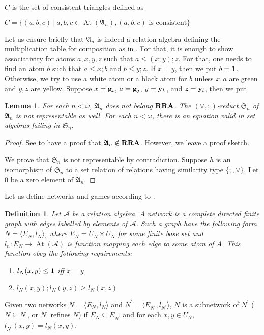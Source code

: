 \documentclass[a4paper]{article}
\theoremstyle{defin}
\newtheorem{defin}{Definition}
\theoremstyle{theorem}
\theoremstyle{prop}
\theoremstyle{lemma}
\newtheorem{lemma}{Lemma}
\theoremstyle{ex}
\theoremstyle{col}
\begin{document}
$C$ is the set of consistent triangles defined as

\begin{center}
  $C = \{ (a, b, c ) \: | \: a,b,c \in \operatorname{At}(\mathfrak{A}_n), (a,b,c) \text{ is consistent}\}$
\end{center}

Let us ensure briefly that $\mathfrak{A}_n$ is indeed a relation algebra defining the multiplication table for composition as in \cite{lyndon1950representation}. For that, it is enough to show associativity for atoms $a, x, y, z$ such that $a \leq (x ; y) ; z$. For that, one needs to find an atom $b$ such that $a \leq x ; b$ and $b \leq y ; z$. If $x = y$, then we put $b = {\bf 1}$. Otherwise, we try to use a white atom or a black atom for $b$ unless $x, a$ are green and $y, z$ are yellow.
Suppose $x = {\bf g}_i$, $a = {\bf g}_j$, $y = {\bf y}_k$, and $z = {\bf y}_l$, then we put

\begin{lemma}
  For each $n < \omega$, $\mathfrak{A}_n$ does not belong ${\bf RRA}$. The $(\vee, ;)$-reduct $\mathfrak{S}_n$ of $\mathfrak{A}_n$ is not representable as well. For each $n < \omega$, there is an equation valid in set algebras failing in $\mathfrak{S}_n$.
\end{lemma}

\begin{proof}
  See \cite{hodkinson2000axiomatizability} to have a proof that $\mathfrak{A}_n \notin {\bf RRA}$. However, we leave a proof sketch.

  We prove that $\mathfrak{S}_n$ is not representable by contradiction.
  Suppose $h$ is an isomorphism of $\mathfrak{S}_n$ to a set relation of relations having similarity type $\{ ;, \vee \}$. Let $0$ be a zero element of $\mathfrak{A}_n$.
\end{proof}

Let us define networks and games according to \cite{hirsch1997step}.

\begin{defin}
  Let $\mathcal{A}$ be a relation algebra. A network is a complete directed finite graph with edges labelled by elements of $\mathcal{A}$. Such a graph have the following form. $N = \langle E_N, l_N \rangle$, where $E_N = U_N \times U_N$ for some finite base set and $l_n : E_N \to \operatorname{At}(\mathcal{A})$ is function mapping each edge to some atom of $A$. This function obey the following requirements:
  \begin{enumerate}
    \item $l_N(x,y) \leq {\bf 1}$ iff $x = y$
    \item $l_N(x, y) ; l_N(y,z) \geq l_N(x,z)$
  \end{enumerate}
\end{defin}
Given two networks $N = \langle E_N, l_N \rangle$ and $N^{'} = \langle E_{N^{'}}, l_{N^{'}} \rangle$, $N$ is a subnetwork of $N^{'}$ ($N \subseteq N^{'}$, or $N^{'}$ refines $N$) if $E_N \subseteq E_{N^{'}}$ and for each $x,y \in U_N$, $l_{N^{'}}(x,y) = l_{N}(x,y)$.
\end{document}
